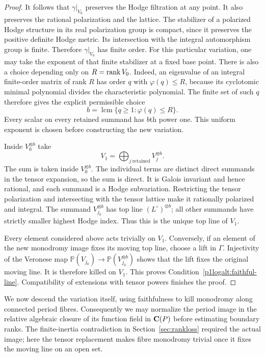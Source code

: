 \begin{proof}
It follows that $\gamma|_{V_0}$ preserves the Hodge filtration at any
point.  It also preserves the rational polarization and the lattice.
The stabilizer of a polarized Hodge structure in its real polarization
group is compact, since it preserves the positive definite Hodge metric.
Its intersection with the integral automorphism group is finite.
Therefore $\gamma|_{V_0}$ has finite order. For this particular
variation, one may take the exponent of that finite stabilizer at a
fixed base point. There is also a choice depending only on
$R=\operatorname{rank} V_0$.  Indeed, an eigenvalue of an integral finite-order matrix
of rank $R$ has order $q$ with $\varphi(q)\le R$, because its cyclotomic
minimal polynomial divides the characteristic polynomial.  The finite
set of such $q$ therefore gives the explicit permissible choice
\[
             b=\operatorname{lcm}\{q\geq1:\varphi(q)\leq R\}.
\]
Every scalar on every retained summand has $b$th power one.  This
uniform exponent is chosen before constructing the new variation.

Inside $V_0^{\otimes b}$ take
\[
 V_1=\bigoplus_{j\ \mathrm{retained}}V_j^{\otimes b}.
\]
The sum is taken inside $V_0^{\otimes b}$. The individual terms are
distinct direct summands in the tensor expansion, so the sum
is direct.  It is Galois invariant and hence rational, and each summand
is a Hodge subvariation.  Restricting the tensor polarization and
intersecting with the tensor lattice make it rationally polarized and
integral.  The summand
$V_{j_0}^{\otimes b}$ has top line $(L^\circ)^{\otimes b}$; all other
summands have strictly smaller highest Hodge index.  Thus this is the
unique top line of $V_1$.

Every element considered above acts trivially on $V_1$.  Conversely, if
an element of the new monodromy image fixes its moving top line, choose
a lift in $\Gamma$.  Injectivity of the Veronese map
$\mathbb P(V_{j_0})\to\mathbb P(V_{j_0}^{\otimes b})$ shows that the lift
fixes the original moving line.  It is therefore killed on $V_1$.
This proves Condition~\eqref{p1logalt:faithful-line}.  Compatibility of extensions
with tensor powers finishes the proof.
\end{proof}

We now descend the variation itself, using faithfulness to kill
monodromy along connected period fibres. Consequently we may
normalize the period image in the relative algebraic closure of its
function field in $\mathbf C(P)$ before estimating boundary ranks. The
finite-inertia contradiction in Section~\ref{sec:rankloss} required
the actual image; here the tensor replacement makes fibre monodromy
trivial once it fixes the moving line on an open set.

